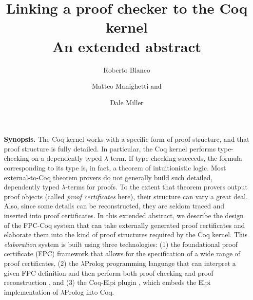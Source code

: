 \documentclass[submission,copyright,creativecommons]{eptcs}
\title{Linking a \lP proof checker to the Coq kernel\\
       An extended abstract}
\author{Roberto Blanco
\institute{INRIA Paris, France}
\and Matteo Manighetti and 
\institute{INRIA Saclay \\ LIX, \'Ecole Polytechnique, France}
\and Dale Miller
\institute{INRIA Saclay \\ LIX, \'Ecole Polytechnique, France}}
\newcommand{\lP}{$\lambda$Prolog\xspace}
\newcommand{\fpccoq}{FPC-Coq\xspace}
\begin{document}
\maketitle

\noindent\textbf{Synopsis.}  The Coq kernel works with a specific form
of proof structure, and that proof structure is fully detailed.  In
particular, the Coq kernel performs type-checking on a dependently
typed $\lambda$-term.  If type checking succeeds, the formula
corresponding to its type is, in fact, a theorem of intuitionistic
logic.  Most external-to-Coq theorem provers do not generally build
such detailed, dependently typed $\lambda$-terms for proofs.  To the
extent that theorem provers output proof objects (called \emph{proof
  certificates} here), their structure can vary a great deal.  Also,
since some details can be reconstructed, they are seldom traced and
inserted into proof certificates.  In this extended abstract, we
describe the design of the \fpccoq system that can take externally
generated proof certificates and elaborate them into the kind of proof
structures required by the Coq kernel.  This \emph{elaboration} system
is built using three technologies: (1) the foundational proof
certificate (FPC) framework \cite{chihani17jar} that allows for the
specification of a wide range of proof certificates, (2) the \lP
programming language \cite{miller12proghol} that can interpret a given
FPC definition and then perform both proof checking and proof
reconstruction \cite{blanco17phd,blanco17cade}, and (3) the Coq-Elpi
plugin \cite{coq-elpi20web}, which embeds the Elpi implementation
\cite{dunchev15lpar} of \lP into Coq.

\bigskip
\end{document}
